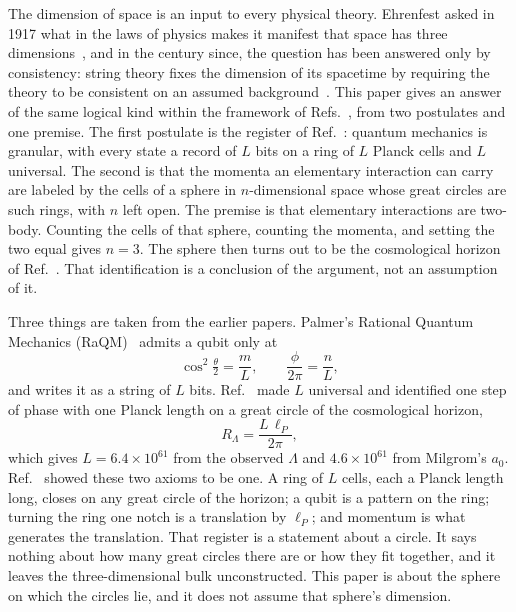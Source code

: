 \documentclass[aps,prd,twocolumn,superscriptaddress,nofootinbib]{revtex4-2}
\begin{document}
The dimension of space is an input to every physical theory. Ehrenfest asked in 1917 what in the laws of physics makes it manifest that space has three dimensions~\cite{ehrenfest1917}, and in the century since, the question has been answered only by consistency: string theory fixes the dimension of its spacetime by requiring the theory to be consistent on an assumed background~\cite{lovelace1971,goddard1972}. This paper gives an answer of the same logical kind within the framework of Refs.~\cite{korytko2026,korytko2026b,korytko2026c}, from two postulates and one premise. The first postulate is the register of Ref.~\cite{korytko2026c}: quantum mechanics is granular, with every state a record of $L$ bits on a ring of $L$ Planck cells and $L$ universal. The second is that the momenta an elementary interaction can carry are labeled by the cells of a sphere in $n$-dimensional space whose great circles are such rings, with $n$ left open. The premise is that elementary interactions are two-body. Counting the cells of that sphere, counting the momenta, and setting the two equal gives $n = 3$. The sphere then turns out to be the cosmological horizon of Ref.~\cite{korytko2026}. That identification is a conclusion of the argument, not an assumption of it.

Three things are taken from the earlier papers. Palmer's Rational Quantum Mechanics (RaQM)~\cite{palmer2020,palmer2026,palmer2026b,palmer2026c} admits a qubit only at
\begin{equation}
\cos^2\tfrac{\theta}{2} = \frac{m}{L},\qquad \frac{\phi}{2\pi} = \frac{n}{L},
\label{eq:raqm}
\end{equation}
and writes it as a string of $L$ bits. Ref.~\cite{korytko2026} made $L$ universal and identified one step of phase with one Planck length on a great circle of the cosmological horizon,
\begin{equation}
R_\Lambda = \frac{L\,\ell_P}{2\pi},
\label{eq:ident}
\end{equation}
which gives $L = 6.4\times10^{61}$ from the observed $\Lambda$ and $4.6\times10^{61}$ from Milgrom's $a_0$. Ref.~\cite{korytko2026c} showed these two axioms to be one. A ring of $L$ cells, each a Planck length long, closes on any great circle of the horizon; a qubit is a pattern on the ring; turning the ring one notch is a translation by $\ell_P$; and momentum is what generates the translation. That register is a statement about a circle. It says nothing about how many great circles there are or how they fit together, and it leaves the three-dimensional bulk unconstructed. This paper is about the sphere on which the circles lie, and it does not assume that sphere's dimension.
\end{document}
